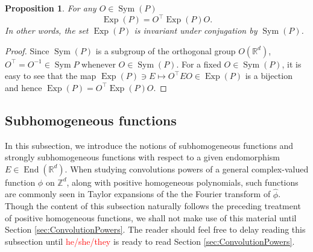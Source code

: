 \documentclass[11pt]{article}
\newtheorem{proposition}[theorem]{Proposition}
\newcommand\End{\operatorname{End}} %
\newcommand\OdR{\mbox{O}_d(\mathbb{R})} %
\newcommand\Sym{\operatorname{Sym}}
\newcommand\Exp{\operatorname{Exp}}
\begin{document}
\begin{proposition}\label{prop:ExpP}
For any  $O \in \Sym{(P)} $
\begin{equation*}
    \Exp(P) = O^\top \Exp(P) O.
\end{equation*}
In other words, the set $\Exp(P)$ is invariant under conjugation by $\Sym(P)$.
\end{proposition}

\begin{proof}
Since $\Sym(P)$ is a subgroup of the orthogonal group $O(\mathbb{R}^d)$, $O^\top = O^{-1} \in \Sym{P}$ whenever $O\in\Sym(P)$. For a fixed $O\in\Sym(P)$, it is easy to see that the map $\Exp(P)\ni E\mapsto  O^\top E O\in\Exp(P)$ is a bijection and hence $\Exp(P)=O^\top \Exp(P) O$. 
\end{proof}

\subsection{Subhomogeneous functions}\label{subsec:SubhomogeneousFunctions}
In this subsection, we introduce the notions of subhomogeneous functions and strongly subhomogeneous functions with respect to a given endomorphism $E\in\End(\mathbb{R}^d)$. When studying convolutions powers of a general complex-valued function $\phi$ on $\mathbb{Z}^d$, along with positive homogeneous polynomials, such functions are commonly seen in Taylor expansions of the the Fourier transform of $\widehat{\phi}$. Though the content of this subsection naturally follows the preceding treatment of positive homogeneous functions, we shall not make use of this material until Section \ref{sec:ConvolutionPowers}. The reader should feel free to delay reading this subsection until \textcolor{red}{he/she/they} is ready to read Section \ref{sec:ConvolutionPowers}.
\end{document}

